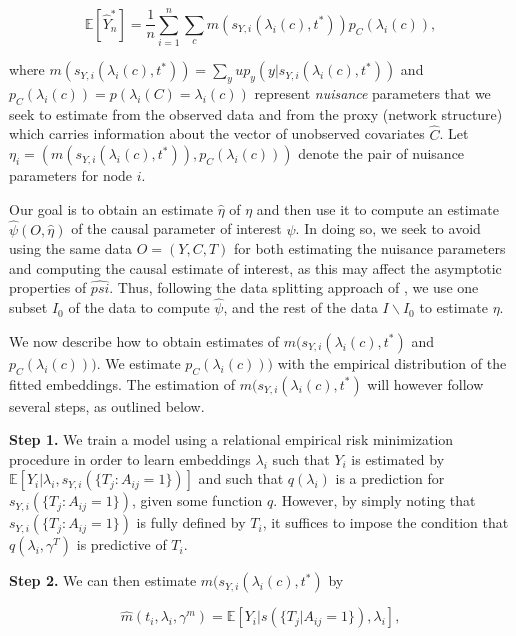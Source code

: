 \documentclass{article}
\begin{document}
$$ \mathbb{E}[\hat{Y}_n^*] = \frac{1}{n} \sum_{i=1}^n \sum_{c} m(s_{Y, i} (\lambda_i(c), t^*)) p_C(\lambda_i(c)), $$


\noindent where $m(s_{Y, i}(\lambda_i(c), t^*)) = \sum_{y} u p_y(y|s_{Y, i}(\lambda_i(c), t^*))$ and $p_C(\lambda_i(c)) = p(\lambda_i(C) = \lambda_i(c))$ represent \textit{nuisance} parameters that we seek to estimate from the observed data and from the proxy (network structure) which carries information about the vector of unobserved covariates $\hat{C}$. Let $\eta_i = (m(s_{Y, i}(\lambda_i(c), t^*)), p_C(\lambda_i(c)))$ denote the pair of nuisance parameters for node $i$. 


Our goal is to obtain an estimate $\hat{\eta}$ of $\eta$ and then use it to compute an estimate $\hat{\psi}(O, \hat{\eta})$ of the causal parameter of interest $\psi$. In doing so, we seek to avoid using the same data $O = (Y, C, T)$ for both estimating the nuisance parameters and computing the causal estimate of interest, as this may affect the asymptotic properties of $\hat{psi}$. Thus, following the data splitting approach of \cite{Chernozhukov:Chetverikov:Demirer:Duflo:Hansen:Newey:2017}, we use one subset $I_0$ of the data to compute $\hat{\psi}$, and the rest of the data $I \backslash I_0$ to estimate $\eta$. 

We now describe how to obtain estimates of $m(s_{Y, i}(\lambda_i(c), t^*)$ and $p_C(\lambda_i(c)))$. We estimate $p_C(\lambda_i(c)))$ with the empirical distribution of the fitted embeddings. The estimation of $m(s_{Y, i}(\lambda_i(c), t^*)$ will however follow several steps, as outlined below. 

\noindent \textbf{Step 1.} We train a model using a relational empirical risk minimization procedure \cite{Veitch:Austern:Zhou:Blei:Orbanz:2019} in order to learn embeddings $\lambda_i$ such that $Y_i$ is estimated by $\mathbb{E}[Y_i| \lambda_i, s_{Y, i}(\{ T_j: A_{ij} =1\}) ]$ and such that $ q(\lambda_i)$ is a prediction for $s_{Y, i}(\{ T_j:A_{ij} =1\})$, given some function $q$. However, by simply noting that $s_{Y, i}(\{ T_j:A_{ij} =1\})$ is fully defined by $T_i$, it suffices to impose the condition that $q(\lambda_i, \gamma^T)$ is predictive of $T_i$. 

\smallskip

\noindent \textbf{Step 2.} We can then estimate $m(s_{Y, i}(\lambda_i(c), t^*)$ by 

$$ \hat{m}(t_i, \lambda_i, \gamma^m) = \mathbb{E}[Y_i | s(\{T_j|A_{ij}=1 \}), \lambda_i],$$
\end{document}
